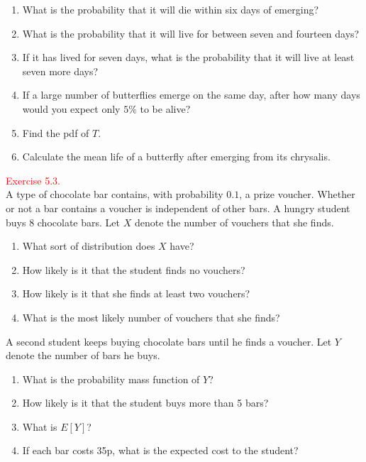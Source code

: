 \documentclass[
]{book}
\providecommand{\tightlist}{%
  \setlength{\itemsep}{0pt}\setlength{\parskip}{0pt}}
\begin{document}
\begin{enumerate}
\def\labelenumi{(\alph{enumi})}
\tightlist
\item
  What is the probability that it will die within six days of emerging?\\
\item
  What is the probability that it will live for between seven and fourteen days?\\
\item
  If it has lived for seven days, what is the probability that it will live at least seven more days?\\
\item
  If a large number of butterflies emerge on the same day, after how many days would you expect only \(5\%\) to be alive?\\
\item
  Find the pdf of \(T\).\\
\item
  Calculate the mean life of a butterfly after emerging from its chrysalis.\\
\end{enumerate}

\hfill\break

\leavevmode{}%
\textcolor{red}{Exercise 5.3.}\\
A type of chocolate bar contains, with probability \(0.1\), a prize voucher.
Whether or not a bar contains a voucher is independent of other bars. A hungry
student buys 8 chocolate bars. Let \(X\) denote the number of vouchers that she finds.

\begin{enumerate}
\def\labelenumi{(\alph{enumi})}
\tightlist
\item
  What sort of distribution does \(X\) have?\\
\item
  How likely is it that the student finds no vouchers?\\
\item
  How likely is it that she finds at least two vouchers?\\
\item
  What is the most likely number of vouchers that she finds?
\end{enumerate}

A second student keeps buying chocolate bars until he finds a voucher. Let \(Y\)
denote the number of bars he buys.

\begin{enumerate}
\def\labelenumi{(\alph{enumi})}
\setcounter{enumi}{4}
\tightlist
\item
  What is the probability mass function of \(Y\)?\\
\item
  How likely is it that the student buys more than 5 bars?\\
\item
  What is \(E[Y]\)?
\item
  If each bar costs 35p, what is the expected cost to the student?
\end{enumerate}
\end{document}
